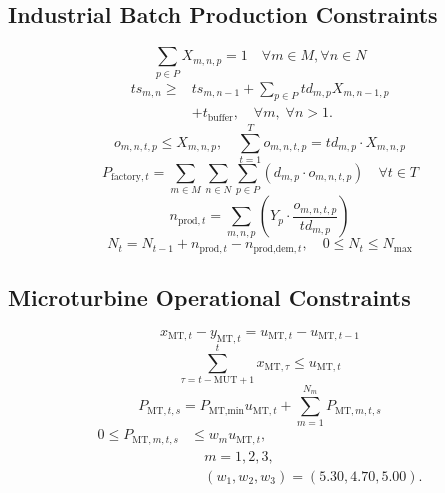 \documentclass[journal]{IEEEtran}
\begin{document}
\subsection{Industrial Batch Production Constraints}
\begin{equation}
\sum_{p \in P} X_{m,n,p} = 1 \quad \forall m \in M, \forall n \in N
\end{equation}
\begin{equation}
\begin{aligned}
ts_{m,n} \geq {}& ts_{m,n-1}
+ \sum_{p\in P} td_{m,p} X_{m,n-1,p}\\
&+ t_{\text{buffer}},
\quad \forall m,\; \forall n>1.
\end{aligned}
\label{eq:time_sequence}
\end{equation}
\begin{equation}
o_{m,n,t,p} \le X_{m,n,p}, \quad \sum_{t=1}^{T} o_{m,n,t,p} = td_{m,p} \cdot X_{m,n,p}
\end{equation}
\begin{equation}
P_{\text{factory},t} = \sum_{m \in M} \sum_{n \in N} \sum_{p \in P} \left( d_{m,p} \cdot o_{m,n,t,p} \right) \quad \forall t \in T
\end{equation}
\begin{equation}
n_{\text{prod},t} = \sum_{m,n,p} \left( Y_p \cdot \frac{o_{m,n,t,p}}{td_{m,p}} \right)
\end{equation}
\begin{equation}
N_t = N_{t-1} + n_{\text{prod},t} - n_{\text{prod,dem},t}, \quad 0 \le N_t \le N_{\text{max}}
\end{equation}

\subsection{Microturbine Operational Constraints}
\begin{equation}
x_{\text{MT},t} - y_{\text{MT},t} = u_{\text{MT},t} - u_{\text{MT},t-1}
\end{equation}
\begin{equation}
\sum_{\tau = t - \text{MUT} + 1}^t x_{\text{MT},\tau} \le u_{\text{MT},t}
\end{equation}
\begin{equation}
P_{\text{MT},t,s} = P_{\text{MT,min}} u_{\text{MT},t} + \sum_{m=1}^{N_m} P_{\text{MT},m,t,s}
\end{equation}
\begin{equation}
\begin{aligned}
0 \leq P_{\text{MT},m,t,s}
&\leq w_m u_{\text{MT},t},\\
&\quad m=1,2,3,\\
&\quad (w_1,w_2,w_3)=(5.30,4.70,5.00).
\end{aligned}
\label{eq:mt_power_bounds}
\end{equation}
\end{document}
